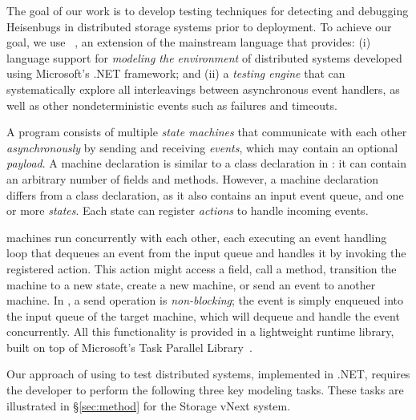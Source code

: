 The goal of our work is to develop testing techniques for detecting and debugging Heisenbugs in distributed storage systems prior to deployment. To achieve our goal, we use \psharp~\cite{deligiannis2015psharp}, an extension of the mainstream \csharp language that provides: (i) language support for \emph{modeling the environment} of distributed systems developed using Microsoft's .NET framework; and (ii) a \emph{testing engine} that can systematically explore all interleavings between asynchronous event handlers, as well as other nondeterministic events such as failures and timeouts.

A \psharp program consists of multiple \emph{state machines} that communicate with each other \emph{asynchronously} by sending and receiving \emph{events}, which may contain an optional \emph{payload}. A \psharp machine declaration is similar to a class declaration in \csharp: it can contain an arbitrary number of fields and methods. However, a machine declaration differs from a class declaration, as it also contains an input event queue, and one or more \emph{states}. Each state can register \emph{actions} to handle incoming events.

\psharp machines run concurrently with each other, each executing an event handling loop that dequeues an event from the input queue and handles it by invoking the registered action. This action might access a field, call a method, transition the machine to a new state, create a new machine, or send an event to another machine. In \psharp, a send operation is \emph{non-blocking}; the event is simply enqueued into the input queue of the target machine, which will dequeue and handle the event concurrently. All this functionality is provided in a lightweight runtime library, built on top of Microsoft's Task Parallel Library~\cite{leijen2009tpl}.

Our approach of using \psharp to test distributed systems, implemented in .NET, requires the developer to perform the following three key modeling tasks. These tasks are illustrated in \S\ref{sec:method} for the \Azure Storage vNext system.

